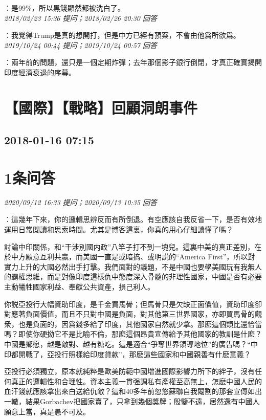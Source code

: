 \documentclass[twocolumn]{ctexart}
\begin{document}
：是99\%，所以黑錢顯然都被洗白了。
\\

\textit{\hfill\noindent\small 2018/02/23 15:36 提问；2018/02/26 20:30 回答}

：我覺得Trump是真的想開打，但是中方已經有預案，不會由他爲所欲爲。
\\

\textit{\hfill\noindent\small 2019/10/24 00:44 提问；2019/10/24 00:57 回答}

：兩年前的問題，還只是一個定期炸彈；去年那個影子銀行倒閉，才真正確實揭開印度經濟衰退的序幕。
\\


\section{【國際】【戰略】回顧洞朗事件}
\subsection{2018-01-16 07:15}


\section{1条问答}

\textit{\hfill\noindent\small 2020/09/12 16:33 提问；2020/09/13 10:35 回答}

：這幾年下來，你的邏輯思辨反而有所倒退。有空應該自我反省一下，是否有效地運用日常閲讀和思索時間。尤其是博客這裏，你真的用心仔細讀懂了嗎？

討論中印關係，和“干涉別國内政”八竿子打不到一塊兒。這裏中美的真正差別，在於中方願意互利共贏，而美國一直是或暗搞、或明説的“America First”，所以對實力上升的大國必然出手打擊。我們面對的議題，不是中國也要學美國玩有我無人的霸權思維，而是對像印度這樣仇中態度深入骨髓的非理性國家，中國是否有必要主動犧牲國家利益、奉獻公共資產，損己利人。

你説亞投行大幅資助印度，是千金買馬骨；但馬骨只是欠缺正面價值，資助印度卻對應著負面價值，而且不只對中國是負面，對其他第三世界國家，亦即買馬骨的觀衆，也是負面的，因爲錢多給了印度，其他國家自然就少拿。那麽這個類比還恰當嗎？即使你硬拗它不是比喻不倫，那麽這個昂貴宣傳給予其他國家的教訓是什麽？中國是鄉愿，越是敵對、越有糖吃。這是適合“爭奪世界領導地位”的廣告嗎？“中印都開戰了，亞投行照樣給印度貸款”，那麽這些國家和中國親善有什麽意義？

亞投行必須獨立，原本就純粹是歐美防範中國增進國際影響力所下的絆子，沒有任何真正的邏輯性和合理性。資本主義一貫强調私有產權至高無上，怎麽中國人民的血汗錢就應該拿出來白送給仇敵？這和40多年前忽悠蘇聯自我閹割的那套宣傳如出一轍，結果Gorbachev把國家賣了，只拿到幾個獎牌；殷鑒不遠，居然還有中國人願意上當，真是愚不可及。
\\
\end{document}
